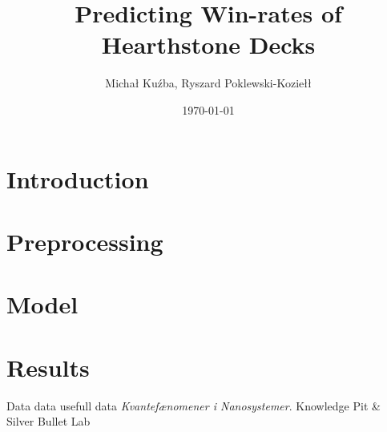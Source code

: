\documentclass[a4paper]{article}
\title{Predicting Win-rates of Hearthstone Decks}
\author{Michał Kuźba, Ryszard Poklewski-Koziełł}
\date{\today}
\begin{document}
\maketitle

\section{Introduction}
\label{sec:introduction}

\section{Preprocessing}

\section{Model}

\section{Results}

\begin{thebibliography}{9}
  Data data usefull data
  \emph{Kvantefænomener i Nanosystemer}.
  Knowledge Pit \& Silver Bullet Lab

\end{thebibliography}
\end{document}
